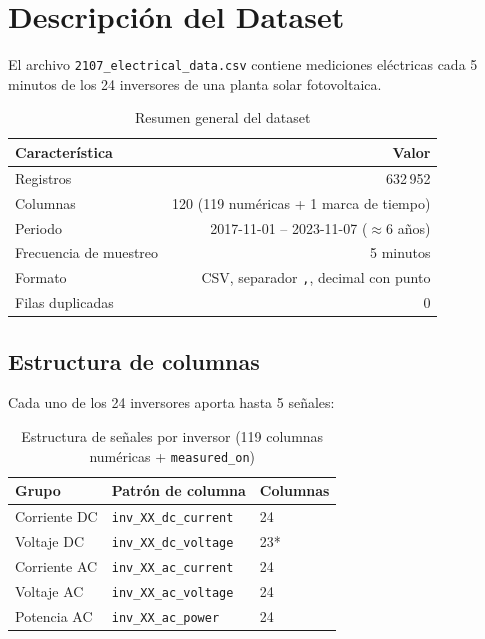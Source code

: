 \section{Descripción del Dataset}
\label{sec:dataset}

El archivo \texttt{2107\_electrical\_data.csv} contiene mediciones eléctricas cada 5 minutos de los 24 inversores de una planta solar fotovoltaica.

\begin{table}[H]
\centering
\begin{tabular}{lr}
\toprule
\textbf{Característica} & \textbf{Valor} \\
\midrule
Registros & 632\,952 \\
Columnas & 120 (119 numéricas + 1 marca de tiempo) \\
Periodo & 2017-11-01 -- 2023-11-07 ($\approx$6 años) \\
Frecuencia de muestreo & 5 minutos \\
Formato & CSV, separador \texttt{,}, decimal con punto \\
Filas duplicadas & 0 \\
\bottomrule
\end{tabular}
\caption{Resumen general del dataset}
\end{table}

\subsection*{Estructura de columnas}

Cada uno de los 24 inversores aporta hasta 5 señales:

\begin{table}[H]
\centering
\begin{tabular}{lll}
\toprule
\textbf{Grupo} & \textbf{Patrón de columna} & \textbf{Columnas} \\
\midrule
Corriente DC & \texttt{inv\_XX\_dc\_current} & 24 \\
Voltaje DC & \texttt{inv\_XX\_dc\_voltage} & 23* \\
Corriente AC & \texttt{inv\_XX\_ac\_current} & 24 \\
Voltaje AC & \texttt{inv\_XX\_ac\_voltage} & 24 \\
Potencia AC & \texttt{inv\_XX\_ac\_power} & 24 \\
\bottomrule
\end{tabular}
\caption{Estructura de señales por inversor (119 columnas numéricas + \texttt{measured\_on})}
\end{table}

